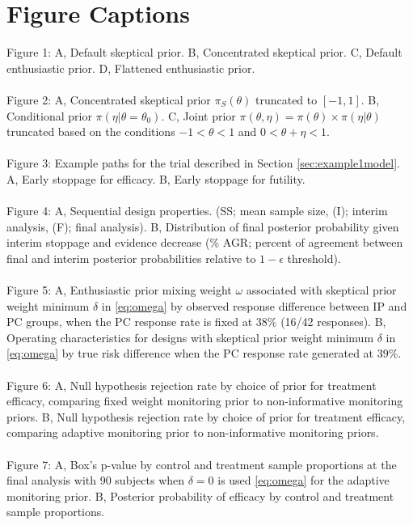 \documentclass[12pt]{article}
\begin{document}
\newpage
\section*{Figure Captions}
Figure 1: {A, Default skeptical prior. B, Concentrated skeptical prior. C, Default enthusiastic prior. D, Flattened enthusiastic prior.}
\\\\
Figure 2: {A, Concentrated skeptical prior $\pi_S(\theta)$ truncated to $[-1,1]$. B, Conditional prior $\pi(\eta|\theta=\theta_0)$. C, Joint prior $\pi(\theta,\eta)=\pi(\theta)\times\pi(\eta|\theta)$ truncated based on the conditions $-1<\theta<1$ and $0<\theta+\eta<1$.}
\\\\
Figure 3: {Example paths for the trial described in Section \ref{sec:example1model}. A, Early stoppage for efficacy. B, Early stoppage for futility.}
\\\\
Figure 4: {A, Sequential design properties. (SS; mean sample size, (I); interim analysis, (F); final analysis). B, Distribution of final posterior probability given interim stoppage and evidence decrease ($\%$ AGR; percent of agreement between final and interim posterior probabilities relative to $1-\epsilon$ threshold).}
\\\\
Figure 5: {A, Enthusiastic prior mixing weight $\omega$ associated with skeptical prior weight minimum $\delta$ in \eqref{eq:omega} by observed response difference between IP and PC groups, when the PC response rate is fixed at $38\%$ (16/42 responses). B, Operating characteristics for designs with skeptical prior weight minimum $\delta$ in \eqref{eq:omega} by true risk difference when the PC response rate generated at $39\%$.}
\\\\
Figure 6: {A, Null hypothesis rejection rate by choice of prior for treatment efficacy, comparing fixed weight monitoring prior to non-informative monitoring priors. B, Null hypothesis rejection rate by choice of prior for treatment efficacy, comparing adaptive monitoring prior to non-informative monitoring priors.}
\\\\
Figure 7: {A, Box's p-value by control and treatment sample proportions at the final analysis with 90 subjects when $\delta=0$ is used \eqref{eq:omega} for the adaptive monitoring prior. B, Posterior probability of efficacy by control and treatment sample proportions.}
\end{document}
